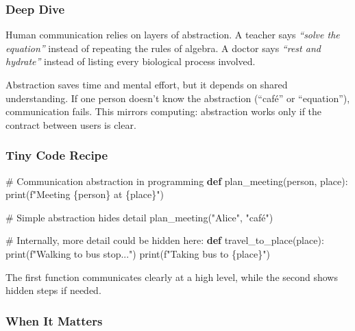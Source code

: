 \documentclass[
  letterpaper,
  DIV=11,
  numbers=noendperiod]{scrreprt}
\newenvironment{Shaded}{\begin{snugshade}}{\end{snugshade}}
\newcommand{\BuiltInTok}[1]{\textcolor[rgb]{0.00,0.23,0.31}{#1}}
\newcommand{\CommentTok}[1]{\textcolor[rgb]{0.37,0.37,0.37}{#1}}
\newcommand{\KeywordTok}[1]{\textcolor[rgb]{0.00,0.23,0.31}{\textbf{#1}}}
\newcommand{\NormalTok}[1]{\textcolor[rgb]{0.00,0.23,0.31}{#1}}
\newcommand{\SpecialCharTok}[1]{\textcolor[rgb]{0.37,0.37,0.37}{#1}}
\newcommand{\SpecialStringTok}[1]{\textcolor[rgb]{0.13,0.47,0.30}{#1}}
\newcommand{\StringTok}[1]{\textcolor[rgb]{0.13,0.47,0.30}{#1}}
\begin{document}
\subsubsection{Deep Dive}\label{deep-dive-17}

Human communication relies on layers of abstraction. A teacher says
\emph{``solve the equation''} instead of repeating the rules of algebra.
A doctor says \emph{``rest and hydrate''} instead of listing every
biological process involved.

Abstraction saves time and mental effort, but it depends on shared
understanding. If one person doesn't know the abstraction (``café'' or
``equation''), communication fails. This mirrors computing: abstraction
works only if the contract between users is clear.

\subsubsection{Tiny Code Recipe}\label{tiny-code-recipe-45}

\begin{Shaded}
\begin{Highlighting}[]
\CommentTok{\# Communication abstraction in programming}
\KeywordTok{def}\NormalTok{ plan\_meeting(person, place):}
    \BuiltInTok{print}\NormalTok{(}\SpecialStringTok{f"Meeting }\SpecialCharTok{\{}\NormalTok{person}\SpecialCharTok{\}}\SpecialStringTok{ at }\SpecialCharTok{\{}\NormalTok{place}\SpecialCharTok{\}}\SpecialStringTok{"}\NormalTok{)}

\CommentTok{\# Simple abstraction hides detail}
\NormalTok{plan\_meeting(}\StringTok{"Alice"}\NormalTok{, }\StringTok{"café"}\NormalTok{)}

\CommentTok{\# Internally, more detail could be hidden here:}
\KeywordTok{def}\NormalTok{ travel\_to\_place(place):}
    \BuiltInTok{print}\NormalTok{(}\SpecialStringTok{f"Walking to bus stop..."}\NormalTok{)}
    \BuiltInTok{print}\NormalTok{(}\SpecialStringTok{f"Taking bus to }\SpecialCharTok{\{}\NormalTok{place}\SpecialCharTok{\}}\SpecialStringTok{"}\NormalTok{)}
\end{Highlighting}
\end{Shaded}

The first function communicates clearly at a high level, while the
second shows hidden steps if needed.

\subsubsection{When It Matters}\label{when-it-matters-45}
\end{document}
